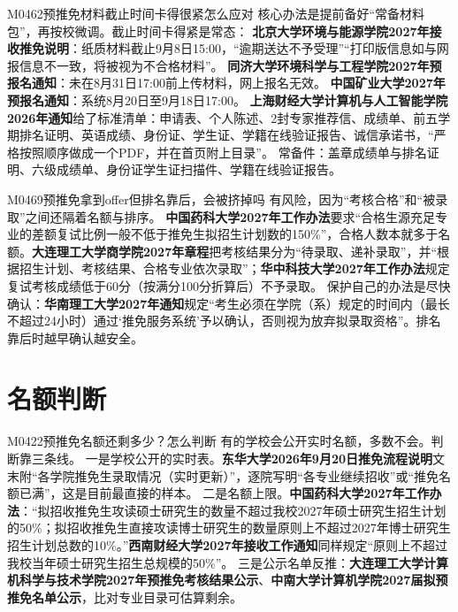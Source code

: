 \begin{qa}{M0462}{预推免材料截止时间卡得很紧怎么应对}
核心办法是提前备好“常备材料包”，再按校微调。截止时间卡得紧是常态：
\textbf{北京大学环境与能源学院2027年接收推免说明}：纸质材料截止9月8日15:00，“逾期送达不予受理”“打印版信息如与网报信息不一致，将被视为不合格材料”。
\textbf{同济大学环境科学与工程学院2027年预报名通知}：未在8月31日17:00前上传材料，网上报名无效。
\textbf{中国矿业大学2027年预报名通知}：系统8月20日至9月18日17:00。
\textbf{上海财经大学计算机与人工智能学院2026年通知}给了标准清单：申请表、个人陈述、2封专家推荐信、成绩单、前五学期排名证明、英语成绩、身份证、学生证、学籍在线验证报告、诚信承诺书，“严格按照顺序做成一个PDF，并在首页附上目录”。
常备件：盖章成绩单与排名证明、六级成绩单、身份证学生证扫描件、学籍在线验证报告。
\end{qa}

\begin{qa}{M0469}{预推免拿到offer但排名靠后，会被挤掉吗}
有风险，因为“考核合格”和“被录取”之间还隔着名额与排序。
\textbf{中国药科大学2027年工作办法}要求“合格生源充足专业的差额复试比例一般不低于推免生拟招生计划数的150\%”，合格人数本就多于名额。\textbf{大连理工大学商学院2027年章程}把考核结果分为“待录取、递补录取”，并“根据招生计划、考核结果、合格专业依次录取”；\textbf{华中科技大学2027年工作办法}规定复试考核成绩低于60分（按满分100分折算后）不予录取。
保护自己的办法是尽快确认：\textbf{华南理工大学2027年通知}规定“考生必须在学院（系）规定的时间内（最长不超过24小时）通过‘推免服务系统’予以确认，否则视为放弃拟录取资格”。排名靠后时越早确认越安全。
\end{qa}

\section{名额判断}
\begin{qa}{M0422}{预推免名额还剩多少？怎么判断}
有的学校会公开实时名额，多数不会。判断靠三条线。
一是学校公开的实时表。\textbf{东华大学2026年9月20日推免流程说明}文末附“各学院推免生录取情况（实时更新）”，逐院写明“各专业继续招收”或“推免名额已满”，这是目前最直接的样本。
二是名额上限。\textbf{中国药科大学2027年工作办法}：“拟招收推免生攻读硕士研究生的数量不超过我校2027年硕士研究生招生计划的50\%；拟招收推免生直接攻读博士研究生的数量原则上不超过2027年博士研究生招生计划总数的10\%。”\textbf{西南财经大学2027年接收工作通知}同样规定“原则上不超过我校当年硕士研究生招生总规模的50\%”。
三是公示名单反推：\textbf{大连理工大学计算机科学与技术学院2027年预推免考核结果公示}、\textbf{中南大学计算机学院2027届拟预推免名单公示}，比对专业目录可估算剩余。
\end{qa}


